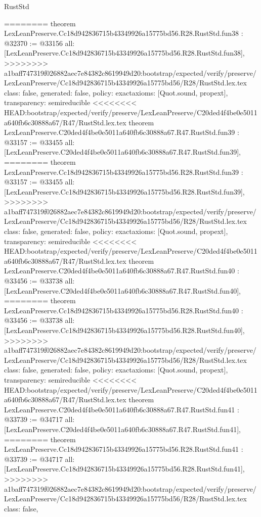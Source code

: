 \begin{lexlean}{RustStd}
\begin{coremodule}
{\begin{coremodule}
{{{{{{{{{{{{{{{{{{{{{{{{{{{{{{{{{{{{{{{{{========
theorem LexLeanPreserve.Cc18d942836715b43349926a15775bd56.R28.RustStd.fun38 : @32370 := @33156 {
  all: [LexLeanPreserve.Cc18d942836715b43349926a15775bd56.R28.RustStd.fun38],
>>>>>>>> a1baff747319f026882aec7e84382c8619949d20:bootstrap/expected/verify/preserve/LexLeanPreserve/Cc18d942836715b43349926a15775bd56/R28/RustStd.lex.tex
  class: false,
  generated: false,
  policy: exact{axioms: [Quot.sound, propext]},
  transparency: semireducible
}
<<<<<<<< HEAD:bootstrap/expected/verify/preserve/LexLeanPreserve/C20ded4f4be0e5011a640fb6c30888a67/R47/RustStd.lex.tex
theorem LexLeanPreserve.C20ded4f4be0e5011a640fb6c30888a67.R47.RustStd.fun39 : @33157 := @33455 {
  all: [LexLeanPreserve.C20ded4f4be0e5011a640fb6c30888a67.R47.RustStd.fun39],
========
theorem LexLeanPreserve.Cc18d942836715b43349926a15775bd56.R28.RustStd.fun39 : @33157 := @33455 {
  all: [LexLeanPreserve.Cc18d942836715b43349926a15775bd56.R28.RustStd.fun39],
>>>>>>>> a1baff747319f026882aec7e84382c8619949d20:bootstrap/expected/verify/preserve/LexLeanPreserve/Cc18d942836715b43349926a15775bd56/R28/RustStd.lex.tex
  class: false,
  generated: false,
  policy: exact{axioms: [Quot.sound, propext]},
  transparency: semireducible
}
<<<<<<<< HEAD:bootstrap/expected/verify/preserve/LexLeanPreserve/C20ded4f4be0e5011a640fb6c30888a67/R47/RustStd.lex.tex
theorem LexLeanPreserve.C20ded4f4be0e5011a640fb6c30888a67.R47.RustStd.fun40 : @33456 := @33738 {
  all: [LexLeanPreserve.C20ded4f4be0e5011a640fb6c30888a67.R47.RustStd.fun40],
========
theorem LexLeanPreserve.Cc18d942836715b43349926a15775bd56.R28.RustStd.fun40 : @33456 := @33738 {
  all: [LexLeanPreserve.Cc18d942836715b43349926a15775bd56.R28.RustStd.fun40],
>>>>>>>> a1baff747319f026882aec7e84382c8619949d20:bootstrap/expected/verify/preserve/LexLeanPreserve/Cc18d942836715b43349926a15775bd56/R28/RustStd.lex.tex
  class: false,
  generated: false,
  policy: exact{axioms: [Quot.sound, propext]},
  transparency: semireducible
}
<<<<<<<< HEAD:bootstrap/expected/verify/preserve/LexLeanPreserve/C20ded4f4be0e5011a640fb6c30888a67/R47/RustStd.lex.tex
theorem LexLeanPreserve.C20ded4f4be0e5011a640fb6c30888a67.R47.RustStd.fun41 : @33739 := @34717 {
  all: [LexLeanPreserve.C20ded4f4be0e5011a640fb6c30888a67.R47.RustStd.fun41],
========
theorem LexLeanPreserve.Cc18d942836715b43349926a15775bd56.R28.RustStd.fun41 : @33739 := @34717 {
  all: [LexLeanPreserve.Cc18d942836715b43349926a15775bd56.R28.RustStd.fun41],
>>>>>>>> a1baff747319f026882aec7e84382c8619949d20:bootstrap/expected/verify/preserve/LexLeanPreserve/Cc18d942836715b43349926a15775bd56/R28/RustStd.lex.tex
  class: false,
}}}}}}}}}}}}}}}}}}}}}}}}}}}}}}}}}}}}}}}}}}}}}
\end{coremodule}}
\end{coremodule}
\end{lexlean}
